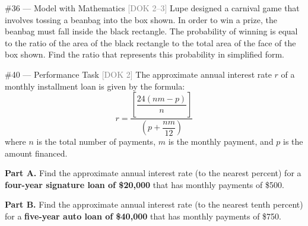 \documentclass[11pt]{article}
\newcommand{\doktag}[1]{\hfill\textcolor{gray}{\small\textsf{[DOK #1]}}}
\newcommand{\workspace}[1]{\vspace{#1}}
\begin{document}
\begin{problem}{\#36 --- Model with Mathematics \doktag{2--3}}
Lupe designed a carnival game that involves tossing a beanbag into the box shown. In order to win a prize, the beanbag must fall inside the black rectangle. The probability of winning is equal to the ratio of the area of the black rectangle to the total area of the face of the box shown. Find the ratio that represents this probability in simplified form.

\begin{center}
\end{center}

\workspace{8cm}
\end{problem}

\newpage

\begin{problem}{\#40 --- Performance Task \doktag{2}}
The approximate annual interest rate $r$ of a monthly installment loan is given by the formula:
\[
r = \dfrac{\left[\dfrac{24(nm - p)}{n}\right]}{\left(p + \dfrac{nm}{12}\right)}
\]
where $n$ is the total number of payments, $m$ is the monthly payment, and $p$ is the amount financed.

\vspace{0.5em}
\textbf{Part A.} Find the approximate annual interest rate (to the nearest percent) for a \textbf{four-year signature loan of \$20{,}000} that has monthly payments of \$500.
\workspace{6cm}

\textbf{Part B.} Find the approximate annual interest rate (to the nearest tenth percent) for a \textbf{five-year auto loan of \$40{,}000} that has monthly payments of \$750.
\workspace{6cm}
\end{problem}
\end{document}
